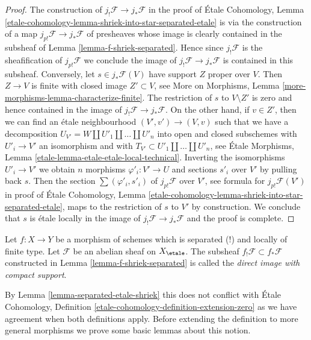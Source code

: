 \begin{proof}
The construction of $j_!\mathcal{F} \to j_*\mathcal{F}$ in the proof of
\'Etale Cohomology, Lemma
\ref{etale-cohomology-lemma-shriek-into-star-separated-etale}
is via the construction of a map
$j_{p!}\mathcal{F} \to j_*\mathcal{F}$ of presheaves
whose image is clearly contained in the subsheaf of
Lemma \ref{lemma-f-shriek-separated}.
Hence since $j_!\mathcal{F}$ is the sheafification of
$j_{p!}\mathcal{F}$ we conclude the image of
$j_!\mathcal{F} \to j_*\mathcal{F}$ is contained in
this subsheaf. Conversely, let $s \in j_*\mathcal{F}(V)$
have support $Z$ proper over $V$. Then $Z \to V$ is
finite with closed image $Z' \subset V$, see
More on Morphisms, Lemma \ref{more-morphisms-lemma-characterize-finite}.
The restriction of $s$ to $V \setminus Z'$ is zero and hence
contained in the image of $j_!\mathcal{F} \to j_*\mathcal{F}$.
On the other hand, if $v \in Z'$, then we can find
an \'etale neighbourhood
$(V', v') \to (V, v)$ such that we have a decomposition
$U_{V'} = W \amalg U'_1 \amalg \ldots \amalg U'_n$
into open and closed subschemes with $U'_i \to V'$ an isomorphism
and with $T_{V'} \subset U'_1 \amalg \ldots \amalg U'_n$, see
\'Etale Morphisms, Lemma \ref{etale-lemma-etale-etale-local-technical}.
Inverting the isomorphisms $U'_i \to V'$
we obtain $n$ morphisms $\varphi'_i : V' \to U$
and sections $s'_i$ over $V'$ by pulling back $s$.
Then the section $\sum (\varphi'_i, s'_i)$ of
$j_{p!}\mathcal{F}$ over $V'$, see formula for $j_{p!}\mathcal{F}(V')$
in proof of \'Etale Cohomology, Lemma
\ref{etale-cohomology-lemma-shriek-into-star-separated-etale},
maps to the restriction of $s$ to $V'$ by construction.
We conclude that $s$ is \'etale locally in the image
of $j_!\mathcal{F} \to j_*\mathcal{F}$ and the proof is complete.
\end{proof}

\begin{definition}
\label{definition-f-shriek-separated}
Let $f : X \to Y$ be a morphism of schemes which is separated (!) and
locally of finite type. Let $\mathcal{F}$ be an abelian sheaf on
$X_\etale$. The subsheaf $f_!\mathcal{F} \subset f_*\mathcal{F}$
constructed in Lemma \ref{lemma-f-shriek-separated} is called the
{\it direct image with compact support}.
\end{definition}

\noindent
By Lemma \ref{lemma-separated-etale-shriek}
this does not conflict with
\'Etale Cohomology, Definition \ref{etale-cohomology-definition-extension-zero}
as we have agreement when both definitions apply.
Before extending the definition to more general morphisms we prove
some basic lemmas about this notion.

